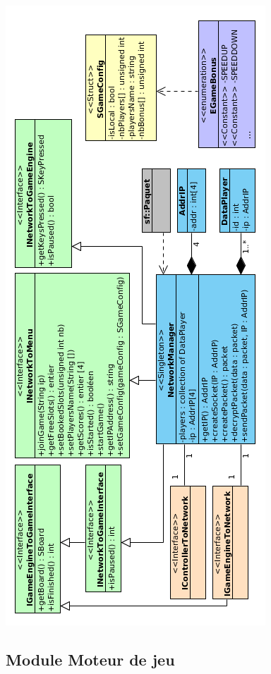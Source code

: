 \begin{center}
\includegraphics[scale=0.8]{images/UML/network.png}
\end{center}

\subsection{Module Moteur de jeu}

